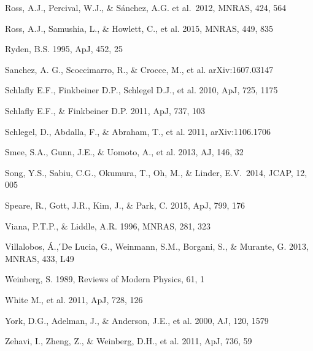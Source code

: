 \documentclass[useAMS,usenatbib]{mnras}
\begin{document}
\begin{thebibliography}{}
Ross, A.J., Percival, W.J., \& S{\'a}nchez, A.G. et al.\ 2012, MNRAS, 424, 564 

Ross, A.J., Samushia, L., \& Howlett, C., et al. 2015, MNRAS, 449, 835

Ryden, B.S. 1995, ApJ, 452, 25  





Sanchez, A. G., Scoccimarro, R., \& Crocce, M., et al.
arXiv:1607.03147

Schlafly E.F., Finkbeiner D.P., Schlegel D.J., et al. 2010, ApJ, 725, 1175

Schlafly E.F., \& Finkbeiner D.P. 2011, ApJ, 737, 103


Schlegel, D., Abdalla, F., \& Abraham, T., et al. 2011, arXiv:1106.1706

Smee, S.A., Gunn, J.E., \& Uomoto, A., et al. 2013, AJ, 146, 32

Song, Y.S., Sabiu, C.G., 
Okumura, T., Oh, M., \& Linder, E.V.\ 2014, JCAP, 12, 005 

Speare, R., Gott, J.R., Kim, J., \& Park, C.
2015, ApJ, 799, 176



Viana, P.T.P., \& Liddle, A.R. 1996, MNRAS, 281, 323

Villalobos, \'{A}., ́De Lucia, G., Weinmann, S.M., Borgani, S., \& Murante, G. 2013, MNRAS, 433, L49


Weinberg, S. 1989, Reviews of Modern Physics, 61, 1

White M., et al. 2011, ApJ, 728, 126

York, D.G., Adelman, J., \& Anderson, J.E., et al. 2000, AJ, 120, 1579

Zehavi, I., Zheng, Z., \& Weinberg, D.H., et al. 2011, ApJ, 736, 59


\end{thebibliography}

\bsp

\label{lastpage}
\end{document}
